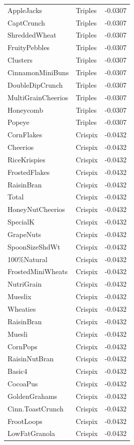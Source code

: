 \begin{table}[!htbp]
\begin{tabular}{lll}
\\
AppleJacks & Triples & -0.0307
\\
CaptCrunch & Triples & -0.0307
\\
ShreddedWheat & Triples & -0.0307
\\
FruityPebbles & Triples & -0.0307
\\
Clusters & Triples & -0.0307
\\
CinnamonMiniBuns & Triples & -0.0307
\\
DoubleDipCrunch & Triples & -0.0307
\\
MultiGrainCheerios & Triples & -0.0307
\\
Honeycomb & Triples & -0.0307
\\
Popeye & Triples & -0.0307
\\
CornFlakes & Crispix & -0.0432
\\
Cheerios & Crispix & -0.0432
\\
RiceKrispies & Crispix & -0.0432
\\
FrostedFlakes & Crispix & -0.0432
\\
RaisinBran & Crispix & -0.0432
\\
Total & Crispix & -0.0432
\\
HoneyNutCheerios & Crispix & -0.0432
\\
SpecialK & Crispix & -0.0432
\\
GrapeNuts & Crispix & -0.0432
\\
SpoonSizeShdWt & Crispix & -0.0432
\\
100\%Natural & Crispix & -0.0432
\\
FrostedMiniWheats & Crispix & -0.0432
\\
NutriGrain & Crispix & -0.0432
\\
Mueslix & Crispix & -0.0432
\\
Wheaties & Crispix & -0.0432
\\
RaisinBran & Crispix & -0.0432
\\
Muesli & Crispix & -0.0432
\\
CornPops & Crispix & -0.0432
\\
RaisinNutBran & Crispix & -0.0432
\\
Basic4 & Crispix & -0.0432
\\
CocoaPus & Crispix & -0.0432
\\
GoldenGrahams & Crispix & -0.0432
\\
Cinn.ToastCrunch & Crispix & -0.0432
\\
FrootLoops & Crispix & -0.0432
\\
LowFatGranola & Crispix & -0.0432

\end{tabular}
\end{table}
